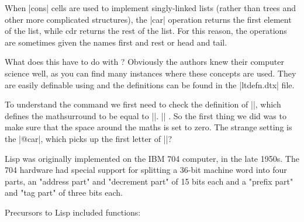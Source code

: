 When |cons| cells are used to implement singly-linked lists (rather than trees and other more complicated structures), the |car| operation returns the first element of the list, while cdr returns the rest of the list. For this reason, the operations are sometimes given the names first and rest or head and tail.

What does this have to do with \latex? Obviously the \latex authors knew their computer science well, as you can find many instances where these concepts are used. They are easily definable using \tex and the definitions can be found in the |ltdefn.dtx| file.






\begin{teX}
\makeatletter
 \def\LaTeXe{%
   \mbox{\m@th%
    \if b\expandafter\@car\f@series\@nil\boldmath\fi
     \LaTeX\kern.15em2$_{\textstyle\varepsilon}$}}
\makeatother
\end{teX}

\scalebox{5}{\LaTeXe}

To understand the command we first need to check the definition of |\m@th|, which defines the mathsurround to be equal to |\z@|. |\def\m@th{\mathsurround\z@}| . So the first thing we did was to make sure that the space around the maths is set to zero. The strange setting is the |@car|, which picks up the first letter of |\boldmath|?

\makeatletter
\def\Latex{%
   \mbox{\m@th%
    \boldmath
     \LaTeX\kern.15em2$_{\textstyle\varepsilon}$}}
\makeatother

\scalebox{5}{\Latex}


Lisp was originally implemented on the IBM 704 computer, in the late 1950s. The 704 hardware had special support for splitting a 36-bit machine word into four parts, an "address part" and "decrement part" of 15 bits each and a "prefix part" and "tag part" of three bits each.

Precursors to Lisp included functions:

